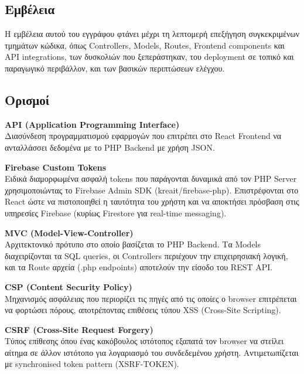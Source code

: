 \documentclass[12pt,a4paper]{report}
\begin{document}
\subsection{Εμβέλεια}
Η εμβέλεια αυτού του εγγράφου φτάνει μέχρι τη λεπτομερή επεξήγηση συγκεκριμένων τμημάτων κώδικα, όπως \textenglish{Controllers}, \textenglish{Models}, \textenglish{Routes}, \textenglish{Frontend components} και \textenglish{API integrations}, των δυσκολιών που ξεπεράστηκαν, του \textenglish{deployment} σε τοπικό και παραγωγικό περιβάλλον, και των βασικών περιπτώσεων ελέγχου.

\subsection{Ορισμοί}

\textbf{API (Application Programming Interface)} \\
Διασύνδεση προγραμματισμού εφαρμογών που επιτρέπει στο \textenglish{React Frontend} να ανταλλάσσει δεδομένα με το \textenglish{PHP Backend} με χρήση \textenglish{JSON}.

\textbf{Firebase Custom Tokens} \\
Ειδικά διαμορφωμένα ασφαλή \textenglish{tokens} που παράγονται δυναμικά από τον \textenglish{PHP Server} χρησιμοποιώντας το \textenglish{Firebase Admin SDK (kreait/firebase-php)}. Επιστρέφονται στο \textenglish{React} ώστε να πιστοποιηθεί η ταυτότητα του χρήστη και να αποκτήσει πρόσβαση στις υπηρεσίες \textenglish{Firebase} (κυρίως \textenglish{Firestore} για \textenglish{real-time messaging}).

\textbf{MVC (Model-View-Controller)} \\
Αρχιτεκτονικό πρότυπο στο οποίο βασίζεται το \textenglish{PHP Backend}. Τα \textenglish{Models} διαχειρίζονται τα \textenglish{SQL queries}, οι \textenglish{Controllers} περιέχουν την επιχειρησιακή λογική, και τα \textenglish{Route} αρχεία (\textenglish{.php endpoints}) αποτελούν την είσοδο του \textenglish{REST API}.

\textbf{CSP (Content Security Policy)} \\
Μηχανισμός ασφάλειας που περιορίζει τις πηγές από τις οποίες ο \textenglish{browser} επιτρέπεται να φορτώσει πόρους, αποτρέποντας επιθέσεις τύπου \textenglish{XSS (Cross-Site Scripting)}.

\textbf{CSRF (Cross-Site Request Forgery)} \\
Τύπος επίθεσης όπου ένας κακόβουλος ιστότοπος εξαπατά τον \textenglish{browser} να στείλει αίτημα σε άλλον ιστότοπο για λογαριασμό του συνδεδεμένου χρήστη. Αντιμετωπίζεται με \textenglish{synchronised token pattern (XSRF-TOKEN)}.
\end{document}
